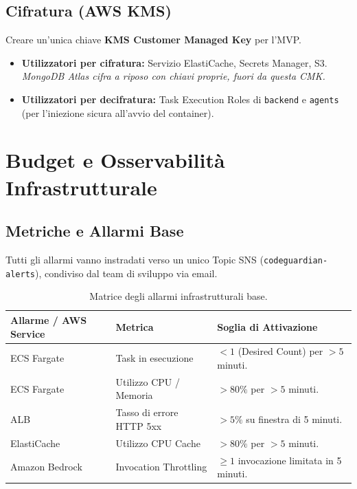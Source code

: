 \documentclass[11pt,a4paper]{article}
\begin{document}
\subsection{Cifratura (AWS KMS)}

Creare un'unica chiave \textbf{KMS Customer Managed Key} per l'MVP.

\begin{itemize}
    \item \textbf{Utilizzatori per cifratura:} Servizio ElastiCache, Secrets Manager, S3. \emph{MongoDB Atlas cifra a riposo con chiavi proprie, fuori da questa CMK.}
    \item \textbf{Utilizzatori per decifratura:} Task Execution Roles di \texttt{backend} e \texttt{agents} (per l'iniezione sicura all'avvio del container).
\end{itemize}

\section{Budget e Osservabilità Infrastrutturale}

\subsection{Metriche e Allarmi Base}

Tutti gli allarmi vanno instradati verso un unico Topic SNS (\texttt{codeguardian-alerts}), condiviso dal team di sviluppo via email.

\begin{table}[H]
\centering
\caption{Matrice degli allarmi infrastrutturali base.}
\label{tab:aws-allarmi}
\vspace{2mm}
\renewcommand{\arraystretch}{1.2}
\begin{tabularx}{\textwidth}{|l|X|X|}
\hline
\textbf{Allarme / AWS Service} & \textbf{Metrica} & \textbf{Soglia di Attivazione} \\ \hline
ECS Fargate & Task in esecuzione & $<1$ (Desired Count) per $>5$ minuti. \\ \hline
ECS Fargate & Utilizzo CPU / Memoria & $>80\%$ per $>5$ minuti. \\ \hline
ALB & Tasso di errore HTTP 5xx & $>5\%$ su finestra di 5 minuti. \\ \hline
ElastiCache & Utilizzo CPU Cache & $>80\%$ per $>5$ minuti. \\ \hline
Amazon Bedrock & Invocation Throttling & $\geq 1$ invocazione limitata in 5 minuti. \\ \hline
\end{tabularx}
\end{table}
\end{document}
